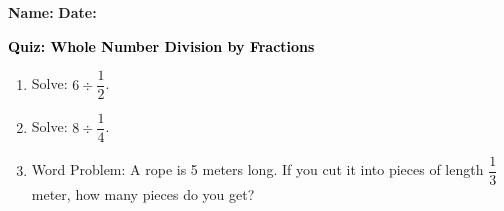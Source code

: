 \documentclass[12pt, letterpaper, fleqn]{article}
\begin{document}
\textbf{Name:} \underline{\hspace{5cm}}
\hfill
\textbf{Date:} \underline{\hspace{3cm}}\\

\begin{tcolorbox}[colback=customteal!20]
    \large\textcolor{black}{\textbf{Quiz: Whole Number Division by Fractions}}
\end{tcolorbox}
\begin{enumerate}[itemsep=3.5cm, leftmargin=0.6cm]
\item Solve: $6 \div \dfrac{1}{2}$.
\vspace{3.5cm}
\item Solve: $8 \div \dfrac{1}{4}$.
\vspace{3.5cm}
\item Word Problem: A rope is 5 meters long. If you cut it into pieces of length $\dfrac{1}{3}$ meter, how many pieces do you get?
\end{enumerate}
\end{document}
